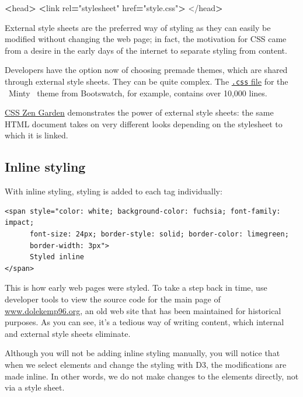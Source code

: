 \documentclass[openany]{book}
\newenvironment{Shaded}{\begin{snugshade}}{\end{snugshade}}
\newcommand{\NormalTok}[1]{#1}
\newcommand{\OperatorTok}[1]{\textcolor[rgb]{0.81,0.36,0.00}{\textbf{#1}}}
\newcommand{\StringTok}[1]{\textcolor[rgb]{0.31,0.60,0.02}{#1}}
\begin{document}
\begin{Shaded}
\begin{Highlighting}[]
\OperatorTok{<}\NormalTok{head}\OperatorTok{>}
    \OperatorTok{<}\NormalTok{link rel}\OperatorTok{=}\StringTok{"stylesheet"}\NormalTok{ href}\OperatorTok{=}\StringTok{"style.css"}\OperatorTok{>}
\NormalTok{</head}\OperatorTok{>}
\end{Highlighting}
\end{Shaded}

External style sheets are the preferred way of styling as they can easily be modified without changing the web page; in fact, the motivation for CSS came from a desire in the early days of the internet to separate styling from content.

Developers have the option now of choosing premade themes, which are shared through external style sheets. They can be quite complex. The \href{https://github.com/thomaspark/bootswatch/blob/master/docs/4/minty/bootstrap.css}{\texttt{.css} file} for the ~Minty~ theme from Bootswatch, for example, contains over 10,000 lines.

\href{http://www.csszengarden.com/}{CSS Zen Garden} demonstrates the power of external style sheets: the same HTML document takes on very different looks depending on the stylesheet to which it is linked.

\hypertarget{inline-styling}{%
\subsection{Inline styling}\label{inline-styling}}

With inline styling, styling is added to each tag individually:

\begin{verbatim}
<span style="color: white; background-color: fuchsia; font-family: impact; 
      font-size: 24px; border-style: solid; border-color: limegreen; 
      border-width: 3px">
      Styled inline
</span>
\end{verbatim}

This is how early web pages were styled. To take a step back in time, use developer tools to view the source code for the main page of \href{http://www.dolekemp96.org/main.htm}{www.dolekemp96.org}, an old web site that has been maintained for historical purposes. As you can see, it's a tedious way of writing content, which internal and external style sheets eliminate.

Although you will not be adding inline styling manually, you will notice that when we select elements and change the styling with D3, the modifications are made inline. In other words, we do not make changes to the elements directly, not via a style sheet.
\end{document}
